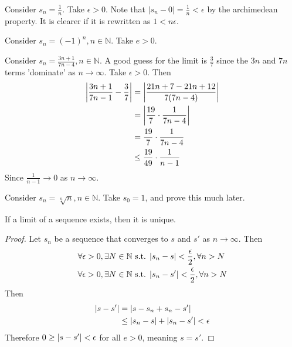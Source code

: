 \documentclass[../notes.tex]{subfiles}
\begin{document}
\begin{example}
	Consider $s_n = \frac{1}{n}$. Take $\epsilon > 0$. Note that $|s_n - 0| = \frac{1}{n} < \epsilon$ by the archimedean property. It is clearer if it is rewritten as $1 < n \epsilon$.
\end{example}

\begin{example}
	Consider $s_n = (-1)^n, n \in \mathbb{N}$. Take $e > 0$. %
\end{example}

\begin{example}
	Consider $s_n = \frac{3n +1}{7n-4}, n \in \mathbb{N}$. A good guess for the limit is $\frac{3}{7}$ since the $3n$ and $7n$ terms 'dominate' as $n \to \infty$. Take $\epsilon > 0$. Then
	\begin{align*}
		\qty|\frac{3n+1}{7n-1} - \frac{3}{7}| &= \qty| \frac{21n + 7 - 21n + 12}{7(7n-4)} | \\
											  &= \qty| \frac{19}{7} \cdot \frac{1}{7n-4} | \\
											  &= \frac{19}{7} \cdot \frac{1}{7n-4} \\
											  &\leq \frac{19}{49} \cdot \frac{1}{n - 1}
	\end{align*}
	Since $\frac{1}{n-1} \to 0$ as $n \to \infty$. %
\end{example}

\begin{example}
	Consider $s_n = \sqrt[n]{n}, n \in \mathbb{N}$. Take $s_0 = 1$, and prove this much later.
\end{example}

\begin{theorem}
	If a limit of a sequence exists, then it is unique.
\end{theorem}

\begin{proof}
	Let $s_n$ be a sequence that converges to $s$ and $s'$ as $n \to \infty$. Then
	\begin{align*}
		\forall \epsilon > 0, \exists N \in \mathbb{N} \text{ s.t. } &\qty|s_n - s| < \frac{\epsilon}{2}, \forall n > N \\
		\forall \epsilon > 0, \exists N \in \mathbb{N} \text{ s.t. } &\qty|s_n - s'| < \frac{\epsilon}{2}, \forall n > N \\
	\end{align*}
	Then
	\begin{align*}
		\qty|s - s'| &= \qty|s - s_n + s_n - s'| \\
					 &\leq \qty|s_n - s| + \qty|s_n - s'| < \epsilon
	\end{align*}
	Therefore $0 \geq \qty|s - s'| < \epsilon$ for all $e > 0$, meaning $s = s'$.
\end{proof}
\end{document}
